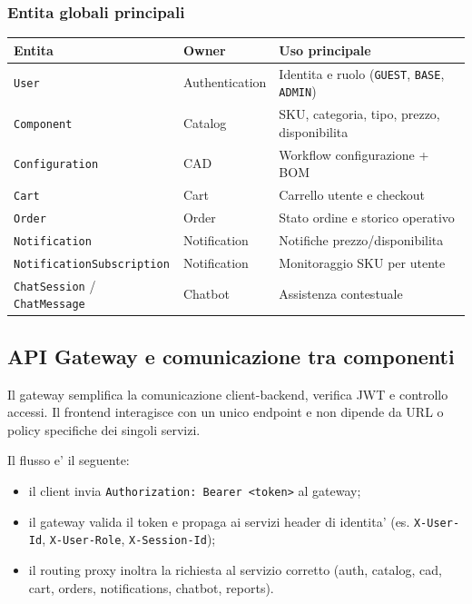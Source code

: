 \subsubsection{Entita globali principali}

\begin{table}[h]
\centering
\begin{tabular}{|l|l|p{7cm}|}
\hline
\textbf{Entita} & \textbf{Owner} & \textbf{Uso principale} \\
\hline
\texttt{User} & Authentication & Identita e ruolo (\texttt{GUEST}, \texttt{BASE}, \texttt{ADMIN}) \\
\hline
\texttt{Component} & Catalog & SKU, categoria, tipo, prezzo, disponibilita \\
\hline
\texttt{Configuration} & CAD & Workflow configurazione + BOM \\
\hline
\texttt{Cart} & Cart & Carrello utente e checkout \\
\hline
\texttt{Order} & Order & Stato ordine e storico operativo \\
\hline
\texttt{Notification} & Notification & Notifiche prezzo/disponibilita \\
\hline
\texttt{NotificationSubscription} & Notification & Monitoraggio SKU per utente \\
\hline
\texttt{ChatSession} / \texttt{ChatMessage} & Chatbot & Assistenza contestuale \\
\hline
\end{tabular}
\end{table}


\subsection{API Gateway e comunicazione tra componenti}

Il gateway semplifica la comunicazione client-backend, verifica JWT e controllo accessi. 
Il frontend interagisce con un unico endpoint e non dipende da URL o policy specifiche dei singoli servizi.

Il flusso e' il seguente:

\begin{itemize}
	\item il client invia \texttt{Authorization: Bearer <token>} al gateway;
	\item il gateway valida il token e propaga ai servizi header di identita' (es. \texttt{X-User-Id}, \texttt{X-User-Role}, \texttt{X-Session-Id});
	\item il routing proxy inoltra la richiesta al servizio corretto (auth, catalog, cad, cart, orders, notifications, chatbot, reports).
\end{itemize}

